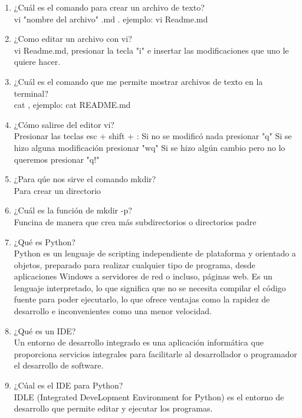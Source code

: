 \documentclass[letterpaper, 12pt, oneside]{article}%
\begin{document}
\begin{enumerate}
    \item ¿Cuál es el comando para crear un archivo de texto?\\
 vi "nombre del archivo" .md . ejemplo: vi Readme.md
 
    \item ¿Como editar un archivo con vi?\\
 vi Readme.md, presionar la tecla "i" e insertar las modificaciones que uno le quiere hacer.
 
    \item ¿Cuál es el comando que me permite mostrar archivos de texto en la terminal?\\
cat , ejemplo: cat README.md
     
    \item ¿Cómo salirse del editor vi?\\
Presionar las teclas esc + shift + :
Si no se modificó nada presionar "q"
Si se hizo alguna modificación presionar "wq"
Si se hizo algún cambio pero no lo queremos presionar "q!"

    \item ¿Para qúe nos sirve el comando mkdir?\\ 
Para crear un directorio

    \item ¿Cuál es la función de mkdir -p?\\
Funcina de manera que crea más subdirectorios o directorios padre

    \item ¿Qué es Python?\\
Python es un lenguaje de scripting independiente de plataforma y orientado a objetos, preparado para realizar cualquier tipo de programa, desde aplicaciones Windows a servidores de red o incluso, páginas web.
 Es un lenguaje interpretado, lo que significa que no se necesita compilar el código fuente para poder ejecutarlo, lo que ofrece ventajas como la rapidez de desarrollo e inconvenientes como una menor velocidad.

    \item ¿Qué es un IDE?\\
Un entorno de desarrollo integrado es una aplicación informática que proporciona servicios integrales
para facilitarle al desarrollador o programador el desarrollo de software.

    \item ¿Cúal es el IDE para Python?\\
IDLE (Integrated DeveLopment Environment for Python) es el entorno de desarrollo que permite
editar y ejecutar los programas.


\end{enumerate}
\end{document}
